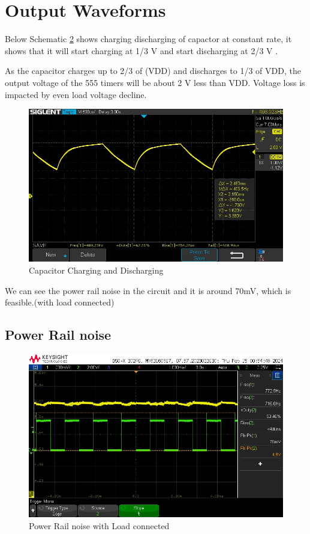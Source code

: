 \documentclass[a4paper,11pt]{article}%
\begin{document}
\section{Output Waveforms}

Below Schematic \ref{cap} shows charging discharging of capactor at constant rate, it shows that it will start charging at 1/3 V and start discharging at 2/3 V .

As the capacitor charges up to 2/3 of (VDD) and discharges to 1/3 of VDD, the output voltage of the 555 timers will be about 2 V less than VDD. Voltage loss is impacted by even load voltage decline.
\begin{figure}[H]
	\centering
	\includegraphics[scale=0.5]{figures/cap}
	\caption{Capacitor Charging and Discharging}
	\label{cap}
\end{figure}


We can see the power rail noise in the circuit and it is around 70mV, which is feasible.(with load connected)
\subsection{Power Rail noise}
\begin{figure}[H]
	\centering
	\includegraphics[scale=0.6]{figures/power_noise_overall.jpg}
	\caption{Power Rail noise with Load connected}
	\label{cap}
\end{figure}
\end{document}
